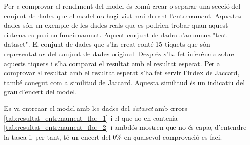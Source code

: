 Per a comprovar el rendiment del model és comú crear o separar una secció del conjunt de dades que el model no hagi vist mai durant l'entrenament. Aquestes dades són un exemple de les dades reals que es podrien trobar quan aquest sistema es posi en funcionament. Aquest conjunt de dades s'anomena "test dataset". El conjunt de dades que s'ha creat conté 15 tiquets que són representatius del conjunt de dades original. Després s'ha fet inferència sobre aquests tiquets i s'ha comparat el resultat amb el resultat esperat. Per a comprovar el resultat amb el resultat esperat s'ha fet servir l'índex de Jaccard, també conegut com a similitud de Jaccard. Aquesta similitud és un indicatiu del grau d'encert del model.

Es va entrenar el model amb les dades del \textit{dataset} amb errors \ref{tab:resultat_entrenament_flor_1} i el que no en contenia \ref{tab:resultat_entrenament_flor_2} i ambdós mostren que no és capaç d'entendre la tasca i, per tant, té un encert del 0\% en qualsevol comprovació es faci.

